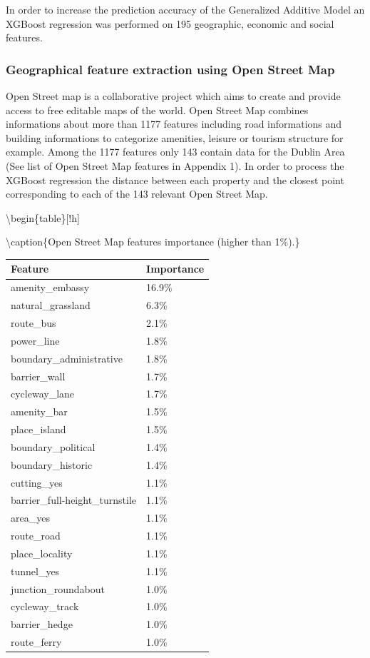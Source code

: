 \documentclass[]{elsarticle} %
\begin{document}
In order to increase the prediction accuracy of the Generalized Additive
Model an XGBoost regression was performed on 195 geographic, economic
and social features.

\subsubsection{Geographical feature extraction using Open Street
Map}\label{geographical-feature-extraction-using-open-street-map}

Open Street map is a collaborative project which aims to create and
provide access to free editable maps of the world. Open Street Map
combines informations about more than 1177 features including road
informations and building informations to categorize amenities, leisure
or tourism structure for example. Among the 1177 features only 143
contain data for the Dublin Area (See list of Open Street Map features
in Appendix 1). In order to process the XGBoost regression the distance
between each property and the closest point corresponding to each of the
143 relevant Open Street Map.

\textbackslash{}begin\{table\}{[}!h{]}

\textbackslash{}caption\{\label{tab:OSM_features}Open Street Map
features importance (higher than 1\%).\} \centering
\fontsize{8}{10}\selectfont

\begin{tabular}{ll}
\toprule
Feature & Importance\\
\midrule
amenity\_embassy & 16.9\%\\
natural\_grassland & 6.3\%\\
route\_bus & 2.1\%\\
power\_line & 1.8\%\\
boundary\_administrative & 1.8\%\\
barrier\_wall & 1.7\%\\
cycleway\_lane & 1.7\%\\
amenity\_bar & 1.5\%\\
place\_island & 1.5\%\\
boundary\_political & 1.4\%\\
boundary\_historic & 1.4\%\\
cutting\_yes & 1.1\%\\
barrier\_full-height\_turnstile & 1.1\%\\
area\_yes & 1.1\%\\
route\_road & 1.1\%\\
place\_locality & 1.1\%\\
tunnel\_yes & 1.1\%\\
junction\_roundabout & 1.0\%\\
cycleway\_track & 1.0\%\\
barrier\_hedge & 1.0\%\\
route\_ferry & 1.0\%\\
\bottomrule
\end{tabular}
\end{document}
